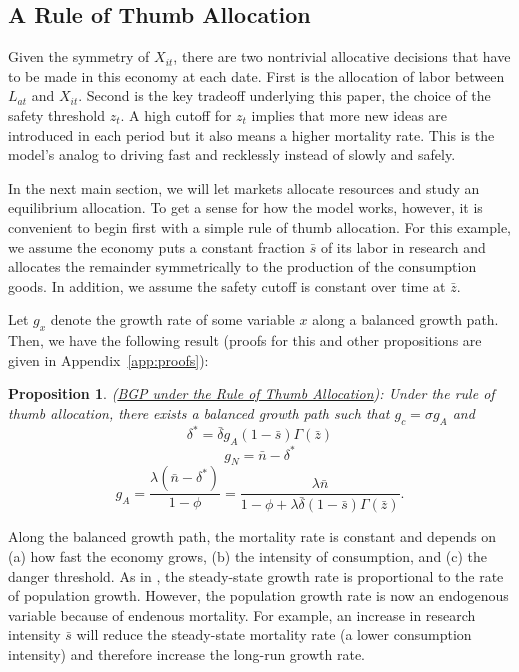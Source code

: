 \documentclass[12pt,twoside]{article}
\newcommand{\cn}[1]{\citet*{#1}}
\newcommand{\proptitle}[1]{\color{ChadBlue} \textnormal{(#1):}}
\newtheorem{proposition}{\color{ChadGreen} Proposition}
\begin{document}
\subsection{A Rule of Thumb Allocation}

Given the symmetry of $X_{it}$, there are two nontrivial allocative
decisions that have to be made in this economy at each date. First is
the allocation of labor between $L_{at}$ and $X_{it}$. Second is the key
tradeoff underlying this paper, the choice of the safety threshold
$z_t$.  A high cutoff for $z_t$ implies that more new ideas are
introduced in each period but it also means a higher mortality rate.
This is the model's analog to driving fast and recklessly instead of
slowly and safely.

In the next main section, we will let markets allocate resources and
study an equilibrium allocation. To get a sense for how the model works,
however, it is convenient to begin first with a simple rule of thumb
allocation. For this example, we assume the economy puts a constant
fraction $\bar{s}$ of its labor in research and allocates the
remainder symmetrically to the production of the consumption goods. In
addition, we assume the safety cutoff is constant over time at
$\bar{z}$.

Let $g_x$ denote the growth rate of some variable $x$ along a balanced
growth path. Then, we have the following result (proofs for this and
other propositions are given in Appendix~\ref{app:proofs}):
\begin{proposition}
\proptitle{\hyperlink{proof:rule}{BGP under the Rule of Thumb Allocation}}
\label{prop:rule} \hypertarget{prop:rule}{}
Under the rule of thumb allocation, there exists a balanced growth path
such that $g_c=\sigma g_A$ and
\begin{equation}
\label{eq:drule}
\delta^* = \bar{\delta} g_A (1-\bar{s}) \Gamma(\bar{z})
\end{equation}
\begin{equation}
\label{eq:gNrule}
 g_N = \bar{n}-\delta^*
\end{equation}
\begin{equation}
\label{eq:gArule}
g_A =\frac{\lambda (\bar{n}-\delta^*)}{1-\phi} = \frac{\lambda \bar{n}}{1-\phi+\lambda \bar{\delta}
  (1-\bar{s}) \Gamma(\bar{z})}.  
\end{equation}
\end{proposition}

Along the balanced growth path, the mortality rate is constant and
depends on (a) how fast the economy grows, (b) the intensity of
consumption, and (c) the danger threshold. As in \cn{JonesRND}, the
steady-state growth rate is proportional to the rate of population
growth. However, the population growth rate is now an endogenous
variable because of endenous mortality.  For example, an increase in
research intensity $\bar{s}$ will reduce the steady-state mortality rate
(a lower consumption intensity) and therefore increase the long-run
growth rate.
\end{document}
